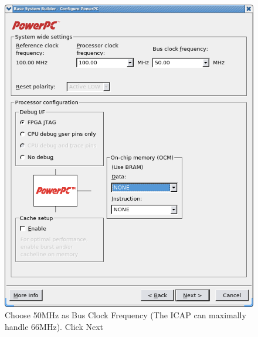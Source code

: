 \documentclass[a4paper,oneside]{memoir}
\begin{document}
\begin{figure}[H]
\centering
\includegraphics[scale=0.4]{BSB4}
\caption{Choose 50MHz as Bus Clock Frequency (The ICAP can maximally handle 66MHz). Click Next\label{fig:BSB4}}
\end{figure}
\end{document}
